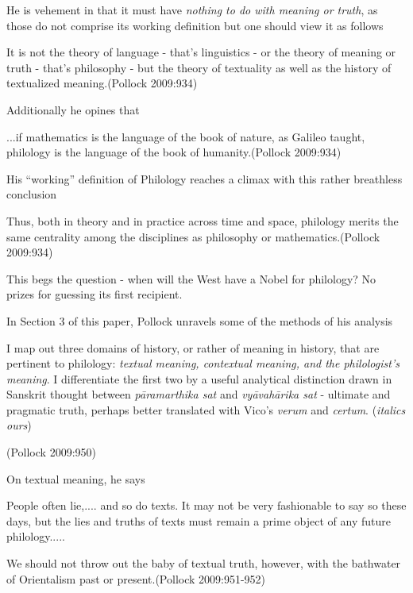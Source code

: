 He is vehement in that it must have {{\sl nothing to do with meaning or truth}\relax}, as those do not comprise its working definition but one should view it as follows
\begin{myquote}
It is not the theory of language - that's linguistics - or the theory of meaning or truth - that's philosophy - but the theory of textuality as well as the history of textualized meaning.\hfill (Pollock 2009:934)
\end{myquote}

Additionally he opines that
\begin{myquote}
...if mathematics is the language of the book of nature, as Galileo taught, philology is the language of the book of humanity.\hfill (Pollock 2009:934)
\end{myquote}

His ``working'' definition of Philology reaches a climax with this rather breathless conclusion
\begin{myquote}
Thus, both in theory and in practice across time and space, philology merits the same centrality among the disciplines as philosophy or mathematics.\hfill (Pollock 2009:934)
\end{myquote}

This begs the question - when will the West have a Nobel for philology? No prizes for guessing its first recipient.

In Section 3 of this paper, Pollock unravels some of the methods of his analysis
\begin{myquote}
I map out three domains of history, or rather of meaning in history, that are pertinent to philology: {\sl textual meaning, contextual meaning, and the philologist's meaning}. I differentiate the first two by a useful analytical distinction drawn in Sanskrit thought between {\sl pāramarthika sat} and {\sl vyāvahārika sat} -  ultimate and pragmatic truth, perhaps better translated with Vico's {\sl verum} and {\sl certum}. ({\sl italics ours})

\hfill (Pollock 2009:950) 
\end{myquote}

On textual meaning, he says
\begin{myquote}
People often lie,.... and so do texts. It may not be very fashionable to say so these days, but the lies and truths of texts must remain a prime object of any future philology.....

We should not throw out the baby of textual truth, however, with the bathwater of Orientalism past or present.\hfill (Pollock 2009:951-952)
\end{myquote}


